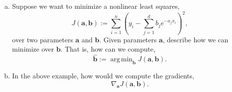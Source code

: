\documentclass[11pt]{article}
\def\argmin{\mathop{\mathrm{arg\,min}}}
\newcommand{\abf}{\mathbf{a}}
\newcommand{\bbf}{\mathbf{b}}
\begin{document}
\begin{enumerate}
\begin{enumerate}[(a)]
\item Suppose we want to minimize a nonlinear least squares,
\[
    J(\abf,\bbf) := \sum_{i=1}^n \left( y_i -
        \sum_{j=1}^d b_j e^{-a_jx_i} \right)^2,
\]
over two parameters $\abf$ and $\bbf$.  Given parameters $\abf$,
describe how we can minimize over $\bbf$.  That is, how can we compute,
\[
    \hat{\bbf} := \argmin_{\bbf} J(\abf,\bbf).
\]

\item In the above example, how would we compute the gradients,
\[
    \nabla_\abf J(\abf,\bbf).
\]

\end{enumerate}

\end{enumerate}
\end{document}
